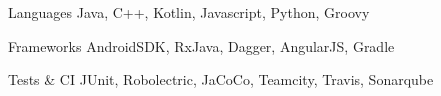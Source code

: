 

\begin{cvskills}

  \cvskill
    {Languages} %
    {Java, C++, Kotlin, Javascript, Python, Groovy} %

  \cvskill
    {Frameworks} %
    {AndroidSDK, RxJava, Dagger, AngularJS, Gradle} %
    
  \cvskill
    {Tests \& CI} %
    {JUnit, Robolectric, JaCoCo, Teamcity, Travis, Sonarqube} %

\end{cvskills}